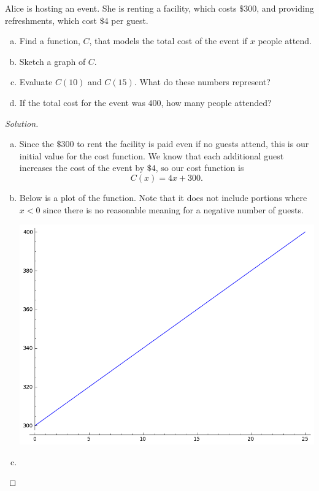 \documentclass[12pt]{amsart}
\begin{document}
\begin{thm}[16 Points]\label{ex7}
  Alice is hosting an event.  She is renting a facility, which costs $\$300$, and providing refreshments, which cost $\$4$ per guest.
  \begin{enumerate}[(a)]
  \item
    Find a function, $C$, that models the total cost of the event if $x$ people attend.
  \item
    Sketch a graph of $C$.
  \item
    Evaluate $C(10)$ and $C(15)$.  What do these numbers represent?
  \item
    If the total cost for the event was $400$, how many people attended?
  \end{enumerate}
  
  \begin{proof}[Solution]
    \begin{enumerate}[(a)]
    \item
      Since the $\$300$ to rent the facility is paid even if no guests attend, this is our initial value for the cost function.
      We know that each additional guest increases the cost of the event by $\$4$, so our cost function is
      $$C(x) = 4x + 300.$$
    \item
      Below is a plot of the function.  
      Note that it does not include portions where $x < 0$ since there is no reasonable meaning for a negative number of guests.
      \begin{center}
        \includegraphics[scale=0.5]{plot.png}
      \end{center}
    \item

\end{enumerate}
\end{proof}
\end{thm}
\end{document}
